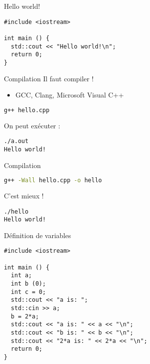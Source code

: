 
\begin{frame}[fragile]{Hello world!}
  \begin{lstlisting}
#include <iostream>

int main () {
  std::cout << "Hello world!\n";
  return 0;
}
  \end{lstlisting}
\end{frame}

\begin{frame}[fragile]{Compilation}
  Il faut compiler !
  \begin{itemize}
    \item GCC, Clang, Microsoft Visual C++
  \end{itemize}

  \begin{lstlisting}[language=bash]
g++ hello.cpp
  \end{lstlisting}

  On peut exécuter :
  \begin{lstlisting}
./a.out
Hello world!
  \end{lstlisting}
\end{frame}

\begin{frame}[fragile]{Compilation}
  \begin{lstlisting}[language=bash]
g++ -Wall hello.cpp -o hello
  \end{lstlisting}

  C'est mieux !
  \begin{lstlisting}
./hello
Hello world!
  \end{lstlisting}
\end{frame}

\begin{frame}[fragile]{Définition de variables}
  \begin{lstlisting}
#include <iostream>

int main () {
  int a;
  int b (0);
  int c = 0;
  std::cout << "a is: ";
  std::cin >> a;
  b = 2*a;
  std::cout << "a is: " << a << "\n";
  std::cout << "b is: " << b << "\n";
  std::cout << "2*a is: " << 2*a << "\n";
  return 0;
}
  \end{lstlisting}
\end{frame}

